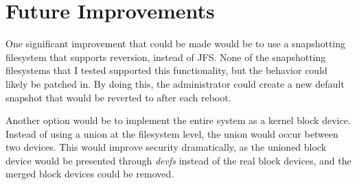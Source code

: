 \documentclass[12pt]{article}
\begin{document}
\section{Future Improvements}
One significant improvement that could be made would be to use a snapshotting
filesystem that supports reversion, instead of JFS.  None of the snapshotting
filesystems that I tested supported this functionality, but the behavior could
likely be patched in. By doing this, the administrator could create a new
default snapshot that would be reverted to after each reboot.  

Another option would be to implement the entire system as a kernel block
device.  Instead of using a union at the filesystem level, the union would
occur between two devices.  This would improve security dramatically, as the
unioned block device would be presented through \emph{devfs} instead of the
real block devices, and the merged block devices could be removed.

\nocite{5350011,1520898,4595934}
\newpage



\end{document}

